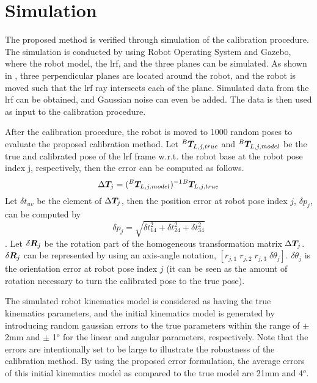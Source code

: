 \section{Simulation}
\label{sec:simulation}

The proposed method is verified through simulation of the calibration procedure. The simulation is conducted by using Robot Operating System and Gazebo, where the robot model, the \ac{lrf}, and the three planes can be simulated.  
As shown in , three perpendicular planes are located around the robot, and the robot is moved such that the \ac{lrf} ray intersects each of the plane. Simulated data from the \ac{lrf} can be obtained, and Gaussian noise can even be added. The data is then used as input to the calibration procedure. 

After the calibration procedure, the robot is moved to 1000 random poses to evaluate the proposed calibration method. Let ${^B}\vb*{T}_{L,j,true}$ and ${^B}\vb*{T}_{L,j,model}$ be the true and calibrated pose of the \ac{lrf} frame w.r.t. the robot base at the robot pose index j, respectively, then the error can be computed as follows. 
\begin{equation}
\Delta \vb*{T}_j =  ({^B}\vb*{T}_{L,j,model})^{-1} {^B}\vb*{T}_{L,j,true}
\end{equation}
Let $\delta t_{uv}$ be the element of $\Delta \vb*{T}_j$, then the position error at robot pose index $j$, $\delta p_j$, can be computed by
\begin{equation}
\delta p_j = \sqrt{\delta t_{14}^2 + \delta t_{24}^2 + \delta t_{34}^2}
\end{equation}.
Let $\delta \vb*{R}_j$ be the rotation part of the homogeneous transformation matrix $\Delta \vb*{T}_j$. $\delta \vb*{R}_j$ can be represented by using an axis-angle notation, $[r_{j,1}\; r_{j,2}\; r_{j,3}\; \delta \theta_j]$. $\delta\theta_j$ is the orientation error at robot pose index $j$ (it can be seen as the amount of rotation necessary to turn the calibrated pose to the true pose). 

The simulated robot kinematics model is considered as having the true kinematics parameters, and the initial kinematics model is generated by introducing random gaussian errors to the true parameters within the range of $\pm$ 2mm and $\pm$ 1$^o$ for the linear and angular parameters, respectively. Note that the errors are intentionally set to be large to illustrate the robustness of the calibration method. By using the proposed error formulation, the average errors of this initial kinematics model as compared to the true model are 21mm and 4$^o$.


